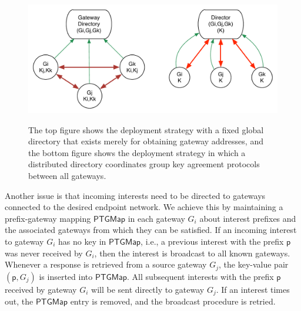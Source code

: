 \begin{figure}[ht!]
\begin{center}
\includegraphics[scale=0.45]{./images/gateway_group.pdf}
\label{fig:gateway-groups}
\caption{The top figure shows the deployment strategy with a fixed global directory that exists merely for obtaining gateway addresses, and the bottom figure shows the deployment strategy in which a distributed directory coordinates group key agreement protocols between all gateways.}
\end{center}
\end{figure}

Another issue is that incoming interests need to be directed to gateways connected to the desired endpoint network. We achieve this by maintaining a prefix-gateway mapping $\mathsf{PTGMap}$ in each gateway $G_i$ about interest prefixes and the associated gateways from which they can be satisfied. If an incoming interest to gateway $G_i$ has no key in $\mathsf{PTGMap}$, i.e., a previous interest with the prefix $\mathsf{p}$ was never received by $G_i$, then the interest is broadcast to all known gateways. Whenever a response is retrieved from a source gateway $G_j$, the key-value pair $(\mathsf{p}, G_j)$ is inserted into $\mathsf{PTGMap}$. All subsequent interests with the prefix $\mathsf{p}$ received by gateway $G_i$ will be sent directly to gateway $G_j$. If an interest times out, the $\mathsf{PTGMap}$ entry is removed, and the broadcast procedure is retried. 

    


